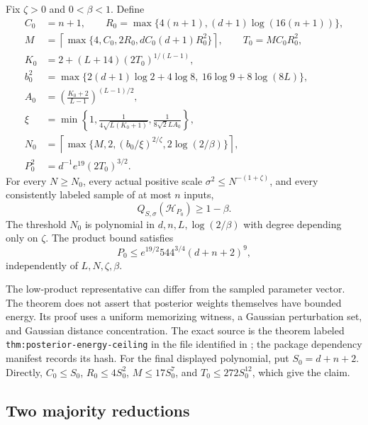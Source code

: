 \begin{theorem}
\label{thm:ceiling}
Fix $\zeta>0$ and $0<\beta<1$. Define
\begin{align*}
 C_0&=n+1,\qquad R_0=\max\{4(n+1),(d+1)\log(16(n+1))\},\\
 M&=\left\lceil\max\{4,C_0,2R_0,dC_0(d+1)R_0^2\}\right\rceil,
 \qquad T_0=MC_0R_0^2,\\
 K_0&=2+(L+14)(2T_0)^{1/(L-1)},\\
 b_0^2&=\max\{2(d+1)\log2+4\log8,\ 16\log9+8\log(8L)\},\\
 A_0&=\left(\frac{K_0+2}{L-1}\right)^{(L-1)/2},\\
 \xi&=\min\left\{1,\frac1{4\sqrt{L(K_0+1)}},
                     \frac1{8\sqrt2 LA_0}\right\},\\
 N_0&=\left\lceil\max\{M,2,(b_0/\xi)^{2/\zeta},
                                     2\log(2/\beta)\}\right\rceil,\\
 P_0^2&=d^{-1}e^{19}(2T_0)^{3/2}.
\end{align*}
For every $N\ge N_0$, every actual positive scale
$\sigma^2\le N^{-(1+\zeta)}$, and every consistently labeled
sample of at most $n$ inputs,
\[
 Q_{S,\sigma}(\mathcal H_{P_0})\ge1-\beta.
\]
The threshold $N_0$ is polynomial in
$d,n,L,\log(2/\beta)$ with degree depending only on $\zeta$.
The product bound satisfies
\[
 P_0\le e^{19/2}544^{3/4}(d+n+2)^9,
\]
independently of $L,N,\zeta,\beta$.
\end{theorem}

The low-product representative can differ from the sampled parameter
vector. The theorem does not assert that posterior weights themselves
have bounded energy. Its proof uses a uniform memorizing witness,
a Gaussian perturbation set, and Gaussian distance concentration.
The exact source is the theorem labeled
\texttt{thm:posterior-energy-ceiling} in the file identified in
\cite{unrestricted}; the package dependency manifest records its hash.
For the final displayed polynomial, put $S_0=d+n+2$. Directly,
$C_0\le S_0$, $R_0\le4S_0^2$, $M\le17S_0^7$, and
$T_0\le272S_0^{12}$, which give the claim.

\subsection{Two majority reductions}

